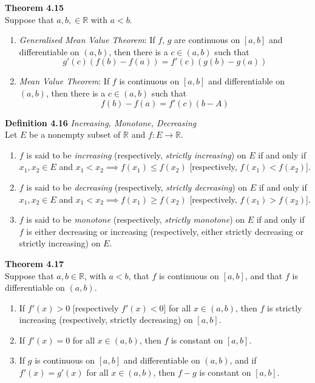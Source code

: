 \documentclass[8pt,landscape]{article}
\begin{document}
\begin{multicols}{3}
    \textbf{Theorem 4.15} \\
    Suppose that $a, b, \in \mathbb{R}$ with $a<b$.
    \begin{enumerate}
        \item \emph{Generalised Mean Value Theorem}:
            If $f$, $g$ are continuous on $[a, b]$ and differentiable on $(a, b)$,
            then there is a $c \in (a, b)$ such that
            \[
                g'(c) (f(b) - f(a)) = f'(c) (g(b) - g(a))
            \]

        \item \emph{Mean Value Theorem}:
            If $f$ is continuous on $[a, b]$ and differentiable on $(a, b)$, then there
            is a $c \in (a, b)$ such that
            \[
                f(b) - f(a) = f'(c)(b-A)
            \]

    \end{enumerate}

    \textbf{Definition 4.16} \emph{Increasing, Monotone, Decreasing} \\
    Let $E$ be a nonempty subset of $\mathbb{R}$ and $f : E \to \mathbb{R}$.
    \begin{enumerate}
        \item $f$ is said to be \emph{increasing}
            (respectively, \emph{strictly increasing}) on $E$ if and only if
            $x_1, x_2 \in E$ and $x_1 < x_2 \implies f(x_1) \leq f(x_2)$
            [respectively, $f(x_1) < f(x_2)$].
        \item $f$ is said to be \emph{decreasing}
            (respectively, \emph{strictly decreasing}) on $E$ if and only if
            $x_1, x_2 \in E$ and $x_1 < x_2 \implies f(x_1) \geq f(x_2)$
            [respectively, $f(x_1) > f(x_2)$].
        \item $f$ is said to be \emph{monotone} (respectively, \emph{strictly monotone})
            on $E$ if and only if $f$ is either decreasing or increasing
            (respectively, either strictly decreasing or strictly increasing) on $E$.
    \end{enumerate}

    \textbf{Theorem 4.17} \\
    Suppose that $a, b \in \mathbb{R}$, with $a<b$, that $f$ is continuous on $[a, b]$,
    and that $f$ is differentiable on $(a, b)$.
    \begin{enumerate}
        \item If $f'(x) > 0$ [respectively $f'(x) < 0$] for all $x \in (a, b)$,
            then $f$ is strictly increasing (respectively, strictly decreasing) on
            $[a, b]$.
        \item If $f'(x) = 0$ for all $x \in (a, b)$, then $f$ is constant on $[a, b]$.
        \item If $g$ is continuous on $[a, b]$ and differentiable on $(a, b)$,
            and if $f'(x) = g'(x)$ for all $x \in (a, b)$, then $f-g$ is constant on
            $[a, b]$.
    \end{enumerate}


\end{multicols}
\end{document}
